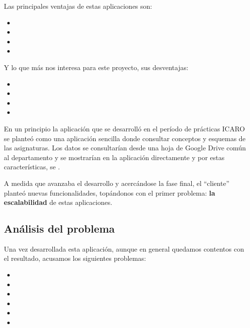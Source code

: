 Las principales ventajas de estas aplicaciones son:

\begin{itemize}
  \item {}
  \item {}
  \item {}
  \item {}
\end{itemize}


\bigskip
Y lo que más nos interesa para este proyecto, sus desventajas:

\begin{itemize}
  \item {}
  \item {}
  \item {}
  \item {}
\end{itemize}


\bigskip
En un principio la aplicación que se desarrolló en el período de prácticas ICARO se planteó como una aplicación sencilla donde consultar conceptos y esquemas de las asignaturas. Los datos se consultarían desde una hoja de Google Drive común al departamento y se mostrarían en la aplicación directamente y por estas características, se .

A medida que avanzaba el desarrollo  y acercándose la fase final, el ``cliente'' planteó nuevas funcionalidades, topándonos con el primer problema: \textbf{la escalabilidad} de estas aplicaciones.



\subsection{Análisis del problema}
Una vez desarrollada esta aplicación, aunque en general quedamos contentos con el resultado, acusamos los siguientes problemas:

\begin{itemize}
  \item {}
  \item {}
  \item {}
  \item {}
  \item {}
  \item {}
\end{itemize}

